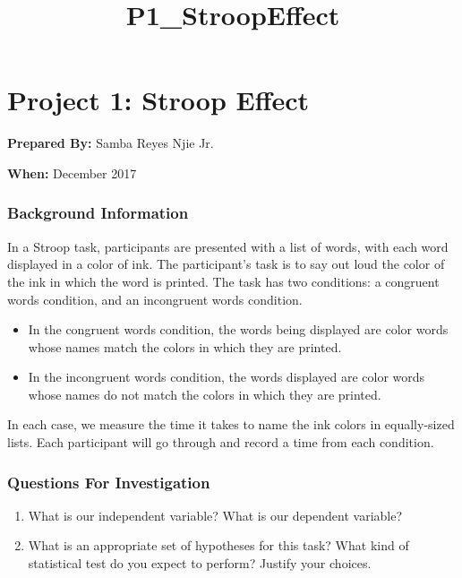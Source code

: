 \documentclass[11pt]{article}
\title{P1\_StroopEffect}
\begin{document}
    
    
    \maketitle
    
    

    
    \hypertarget{project-1-stroop-effect}{%
\section{Project 1: Stroop Effect}\label{project-1-stroop-effect}}

    \textbf{Prepared By:} Samba Reyes Njie Jr.

\textbf{When:} December 2017

    \hypertarget{background-information}{%
\subsubsection{Background Information}\label{background-information}}

In a Stroop task, participants are presented with a list of words, with
each word displayed in a color of ink. The participant's task is to say
out loud the color of the ink in which the word is printed. The task has
two conditions: a congruent words condition, and an incongruent words
condition.

\begin{itemize}
\item
  In the congruent words condition, the words being displayed are color
  words whose names match the colors in which they are printed.
\item
  In the incongruent words condition, the words displayed are color
  words whose names do not match the colors in which they are printed.
\end{itemize}

In each case, we measure the time it takes to name the ink colors in
equally-sized lists. Each participant will go through and record a time
from each condition.

    \hypertarget{questions-for-investigation}{%
\subsubsection{Questions For
Investigation}\label{questions-for-investigation}}

\begin{enumerate}
\def\labelenumi{\arabic{enumi}.}
\item
  What is our independent variable? What is our dependent variable?
\item
  What is an appropriate set of hypotheses for this task? What kind of
  statistical test do you expect to perform? Justify your choices.
\end{enumerate}
\end{document}
